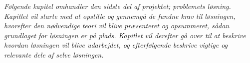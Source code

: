 \textit{Følgende kapitel omhandler den sidste del af projektet; problemets løsning. Kapitlet vil starte med at opstille og gennemgå de fundne krav til løsningen, hvorefter den nødvendige teori vil blive præsenteret og opsummeret, sådan grundlaget for løsningen er på plads. Kapitlet vil derefter gå over til at beskrive hvordan løsningen vil blive udarbejdet, og efterfølgende beskrive vigtige og relevante dele af selve løsningen.}